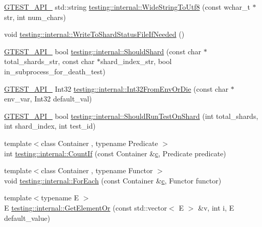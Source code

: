 \begin{DoxyCompactItemize}
\item 
\hyperlink{gtest-port_8h_aa73be6f0ba4a7456180a94904ce17790}{G\+T\+E\+S\+T\+\_\+\+A\+P\+I\+\_\+} std\+::string \hyperlink{namespacetesting_1_1internal_a05b8c86ff38243f34d8f839a0eadefb1}{testing\+::internal\+::\+Wide\+String\+To\+Utf8} (const wchar\+\_\+t $\ast$str, int num\+\_\+chars)
\item 
void \hyperlink{namespacetesting_1_1internal_a19b35b39782d41e6ef76e1910a3a502e}{testing\+::internal\+::\+Write\+To\+Shard\+Status\+File\+If\+Needed} ()
\item 
\hyperlink{gtest-port_8h_aa73be6f0ba4a7456180a94904ce17790}{G\+T\+E\+S\+T\+\_\+\+A\+P\+I\+\_\+} bool \hyperlink{namespacetesting_1_1internal_a0fe41657b1d1ab7ec4e37ec07403ee6c}{testing\+::internal\+::\+Should\+Shard} (const char $\ast$total\+\_\+shards\+\_\+str, const char $\ast$shard\+\_\+index\+\_\+str, bool in\+\_\+subprocess\+\_\+for\+\_\+death\+\_\+test)
\item 
\hyperlink{gtest-port_8h_aa73be6f0ba4a7456180a94904ce17790}{G\+T\+E\+S\+T\+\_\+\+A\+P\+I\+\_\+} Int32 \hyperlink{namespacetesting_1_1internal_aaa576613655c2f380278c255c3ec5fef}{testing\+::internal\+::\+Int32\+From\+Env\+Or\+Die} (const char $\ast$env\+\_\+var, Int32 default\+\_\+val)
\item 
\hyperlink{gtest-port_8h_aa73be6f0ba4a7456180a94904ce17790}{G\+T\+E\+S\+T\+\_\+\+A\+P\+I\+\_\+} bool \hyperlink{namespacetesting_1_1internal_a437bd89f5bc532778d7467600e210395}{testing\+::internal\+::\+Should\+Run\+Test\+On\+Shard} (int total\+\_\+shards, int shard\+\_\+index, int test\+\_\+id)
\item 
{\footnotesize template$<$class Container , typename Predicate $>$ }\\int \hyperlink{namespacetesting_1_1internal_a1e77a774d910346eff11a86d8df783a5}{testing\+::internal\+::\+Count\+If} (const Container \&\hyperlink{jquery_8js_abce695e0af988ece0826d9ad59b8160d}{c}, Predicate predicate)
\item 
{\footnotesize template$<$class Container , typename Functor $>$ }\\void \hyperlink{namespacetesting_1_1internal_a52f5504ed65d116201ccb8f99a44fd7e}{testing\+::internal\+::\+For\+Each} (const Container \&\hyperlink{jquery_8js_abce695e0af988ece0826d9ad59b8160d}{c}, Functor functor)
\item 
{\footnotesize template$<$typename E $>$ }\\E \hyperlink{namespacetesting_1_1internal_a71fdd20a0686bea3dc0cdcd95e0bca1c}{testing\+::internal\+::\+Get\+Element\+Or} (const std\+::vector$<$ E $>$ \&v, int i, E default\+\_\+value)

\end{DoxyCompactItemize}
